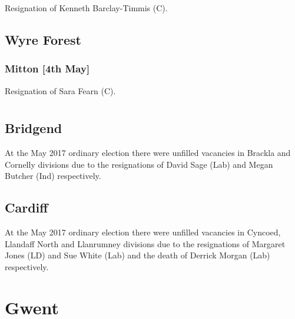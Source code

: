 \documentclass[a4paper,openany]{book}
\begin{document}
\begin{resultsiii}

Resignation of Kenneth Barclay-Timmis (C).

\subsection*{Wyre Forest}

\subsubsection*{Mitton \hspace*{\fill}\nolinebreak[1]%
\enspace\hspace*{\fill}
[4th May]}


Resignation of Sara Fearn (C).

\section[Glamorgan]{}

\subsection*{Bridgend}

At the May 2017 ordinary election there were unfilled vacancies in Brackla and Cornelly divisions due to the resignations of David Sage (Lab) and Megan Butcher (Ind) respectively.

\subsection*{Cardiff}

At the May 2017 ordinary election there were unfilled vacancies in Cyncoed, Llandaff North and Llanrumney divisions due to the resignations of Margaret Jones (LD) and Sue White (Lab) and the death of Derrick Morgan (Lab) respectively.

\section{Gwent}


\end{resultsiii}
\end{document}
